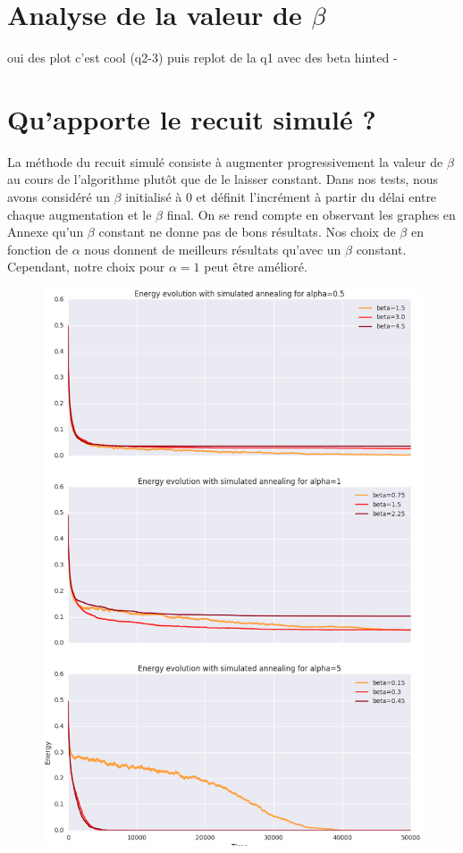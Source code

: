 \documentclass[twocolumn]{article}
\begin{document}
	\section{Analyse de la valeur de $\beta$}
		oui des plot c'est cool (q2-3)
		puis replot de la q1 avec des beta hinted
		- 
	\section{Qu'apporte le recuit simulé ?}
		La méthode du recuit simulé consiste à augmenter progressivement la valeur de $\beta$ au cours de l'algorithme plutôt que de le laisser constant. Dans nos tests, nous avons considéré un $\beta$ initialisé à 0 et définit l'incrément à partir du délai entre chaque augmentation et le $\beta$ final.
		On se rend compte en observant les graphes en Annexe qu'un $\beta$ constant ne donne pas de bons résultats.  Nos choix de $\beta$ en fonction de $\alpha$ nous donnent de meilleurs résultats qu'avec un $\beta$ constant. Cependant, notre choix pour $\alpha = 1$ peut être amélioré.
		
		\begin{figure}
		\includegraphics[width=\columnwidth]{../tobekept/ex1_sim_1683536997971113732-r.png}
		\end{figure}
		
\end{document}
